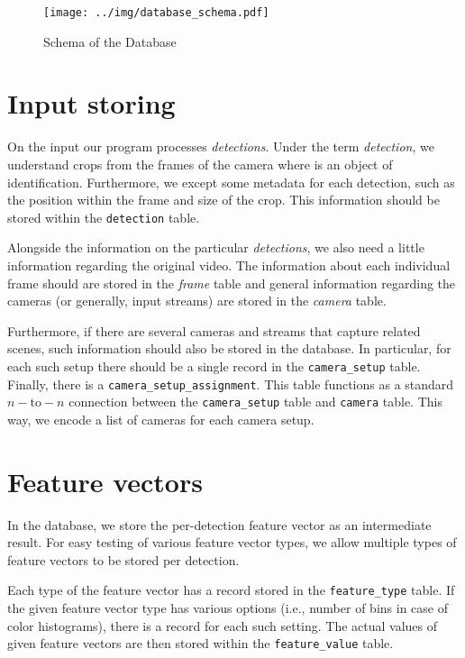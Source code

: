 \begin{figure}
    \centering
    \texttt{[image: ../img/database\_schema.pdf]}
    \caption{Schema of the Database}
    \label{fig:db_structure}
\end{figure}

\section{Input storing}

On the input our program processes \emph{detections}. Under the term \emph{detection}, we understand crops from
the frames of the camera where is an object of identification. Furthermore, we except some metadata for each
detection, such as the position within the frame and size of the crop. This information should be stored within
the \texttt{detection} table.

Alongside the information on the particular \emph{detections}, we also need a little information regarding the
original video. The information about each individual frame should are stored in the \emph{frame} table and general
information regarding the cameras (or generally, input streams) are stored in the \emph{camera} table.

Furthermore, if there are several cameras and streams that capture related scenes, such information should also be
stored in the database. In particular, for each such setup there should be a single record in the \texttt{camera\_setup}
table. Finally, there is a \texttt{camera\_setup\_assignment}. This table functions as a standard $n-\mathrm{to}-n$ connection between the \texttt{camera\_setup} table and \texttt{camera} table. This way, we encode a list of cameras for each camera setup.


\section{Feature vectors}
  
In the database, we store the per-detection feature vector as an intermediate
result. For easy testing of various feature vector types, we allow multiple
types of feature vectors to be stored per detection.

Each type of the feature vector has a record stored in the \texttt{feature\_type}
table. If the given feature vector type has various options (i.e., number of bins in
case of color histograms), there is a record for each such setting. The actual
values of given feature vectors are then stored within the \texttt{feature\_value}
table.

